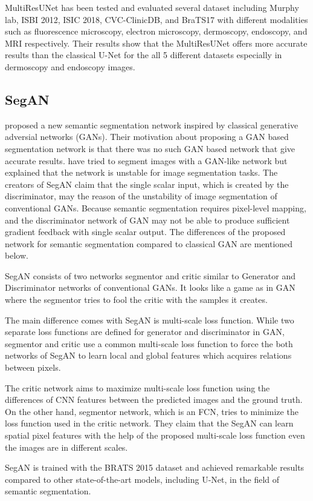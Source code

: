         

        MultiResUNet has been tested and evaluated several dataset including Murphy lab, ISBI 2012, ISIC 2018, CVC-ClinicDB, and BraTS17
        with different modalities such as fluorescence microscopy, electron microscopy, dermoscopy, endoscopy, and MRI respectively.
        Their results show that the MultiResUNet offers more accurate results than the classical U-Net for the all 5 different datasets especially in dermoscopy and endoscopy images.

    \subsection{SegAN}\label{sec:segan}

        \citet{xue2018segan} proposed a new semantic segmentation network inspired by classical generative adversial networks (GANs).
        Their motivation about proposing a GAN based segmentation network is that there was no such GAN based network that give accurate results.
        \citet{luc2016semantic} have tried to segment images with a GAN-like network but explained that the network is unstable for image segmentation tasks.
        The creators of SegAN claim that the single scalar input, which is created by the discriminator,  may the reason of the unstability of image segmentation of conventional GANs.
        Because semantic segmentation requires pixel-level mapping, and the discriminator network of GAN may not be able to produce sufficient gradient feedback with single scalar output.
        The differences of the proposed network for semantic segmentation compared to classical GAN ​​are mentioned below.

        SegAN consists of two networks segmentor and critic similar to Generator and Discriminator networks of conventional GANs.
        It looks like a game as in GAN where the segmentor tries to fool the critic with the samples it creates.

        

        The main difference comes with SegAN is multi-scale loss function. While two separate loss functions are defined for generator and discriminator in GAN,
        segmentor and critic use a common multi-scale loss function to force the both networks of SegAN to learn local and global features which acquires relations between pixels.

        The critic network aims to maximize multi-scale loss function using the differences of CNN features between the predicted images and the ground truth.
        On the other hand, segmentor network, which is an FCN, tries to minimize the loss function used in the critic network.
        They claim that the SegAN can learn spatial pixel features with the help of the proposed multi-scale loss function even the images are in different scales.

        SegAN is trained with the BRATS 2015 dataset and achieved remarkable results compared to other state-of-the-art models, including U-Net, in the field of semantic segmentation.
